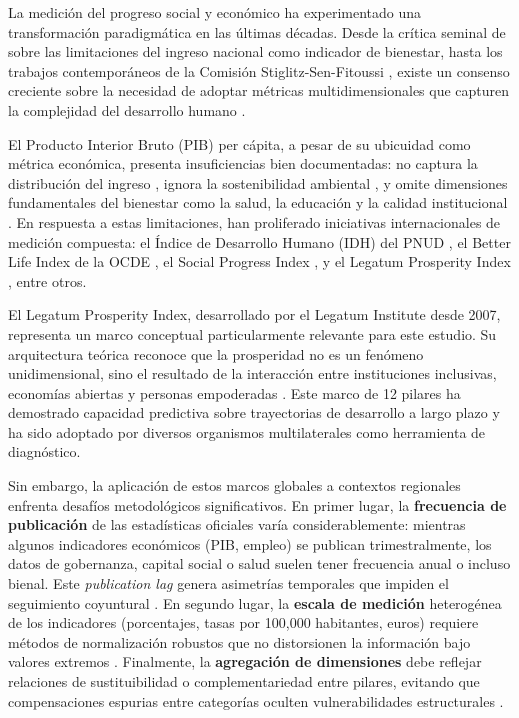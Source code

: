 \documentclass[authoryear,12pt]{elsarticle}
\begin{document}
La medición del progreso social y económico ha experimentado una transformación paradigmática en las últimas décadas. Desde la crítica seminal de \citet{kuznets1934national} sobre las limitaciones del ingreso nacional como indicador de bienestar, hasta los trabajos contemporáneos de la Comisión Stiglitz-Sen-Fitoussi \citep{stiglitz2009report}, existe un consenso creciente sobre la necesidad de adoptar métricas multidimensionales que capturen la complejidad del desarrollo humano \citep{sen1999development, alkire2015multidimensional}.

El Producto Interior Bruto (PIB) per cápita, a pesar de su ubicuidad como métrica económica, presenta insuficiencias bien documentadas: no captura la distribución del ingreso \citep{atkinson2015inequality}, ignora la sostenibilidad ambiental \citep{daly1996beyond}, y omite dimensiones fundamentales del bienestar como la salud, la educación y la calidad institucional \citep{fleurbaey2009beyond}. En respuesta a estas limitaciones, han proliferado iniciativas internacionales de medición compuesta: el Índice de Desarrollo Humano (IDH) del PNUD \citep{undp2020human}, el Better Life Index de la OCDE \citep{oecd2020better}, el Social Progress Index \citep{stern2018social}, y el Legatum Prosperity Index \citep{legatum2024prosperity}, entre otros.

El Legatum Prosperity Index, desarrollado por el Legatum Institute desde 2007, representa un marco conceptual particularmente relevante para este estudio. Su arquitectura teórica reconoce que la prosperidad no es un fenómeno unidimensional, sino el resultado de la interacción entre instituciones inclusivas, economías abiertas y personas empoderadas \citep{legatum2024methodology}. Este marco de 12 pilares ha demostrado capacidad predictiva sobre trayectorias de desarrollo a largo plazo \citep{thompson2020prosperity} y ha sido adoptado por diversos organismos multilaterales como herramienta de diagnóstico.

Sin embargo, la aplicación de estos marcos globales a contextos regionales enfrenta desafíos metodológicos significativos. En primer lugar, la \textbf{frecuencia de publicación} de las estadísticas oficiales varía considerablemente: mientras algunos indicadores económicos (PIB, empleo) se publican trimestralmente, los datos de gobernanza, capital social o salud suelen tener frecuencia anual o incluso bienal. Este \textit{publication lag} genera asimetrías temporales que impiden el seguimiento coyuntural \citep{giannone2008nowcasting}. En segundo lugar, la \textbf{escala de medición} heterogénea de los indicadores (porcentajes, tasas por 100,000 habitantes, euros) requiere métodos de normalización robustos que no distorsionen la información bajo valores extremos \citep{greco2019different}. Finalmente, la \textbf{agregación de dimensiones} debe reflejar relaciones de sustituibilidad o complementariedad entre pilares, evitando que compensaciones espurias entre categorías oculten vulnerabilidades estructurales \citep{decancq2011weights}.
\end{document}
